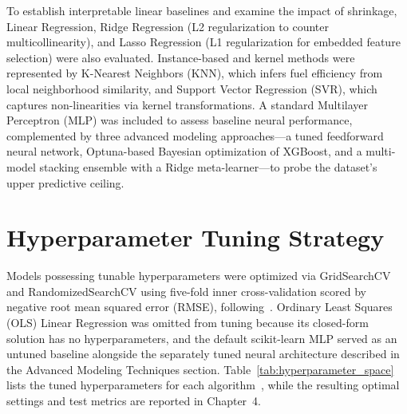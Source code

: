 To establish interpretable linear baselines and examine the impact of shrinkage, Linear Regression, Ridge Regression (L2 regularization to counter multicollinearity), and Lasso Regression (L1 regularization for embedded feature selection) were also evaluated. Instance-based and kernel methods were represented by K-Nearest Neighbors (KNN), which infers fuel efficiency from local neighborhood similarity, and Support Vector Regression (SVR), which captures non-linearities via kernel transformations. A standard Multilayer Perceptron (MLP) was included to assess baseline neural performance, complemented by three advanced modeling approaches---a tuned feedforward neural network, Optuna-based Bayesian optimization of XGBoost, and a multi-model stacking ensemble with a Ridge meta-learner---to probe the dataset's upper predictive ceiling.


\section{Hyperparameter Tuning Strategy}

Models possessing tunable hyperparameters were optimized via GridSearchCV and RandomizedSearchCV using five-fold inner cross-validation scored by negative root mean squared error (RMSE), following~\cite{atique2026explainable}. Ordinary Least Squares (OLS) Linear Regression was omitted from tuning because its closed-form solution has no hyperparameters, and the default scikit-learn MLP served as an untuned baseline alongside the separately tuned neural architecture described in the Advanced Modeling Techniques section. Table~\ref{tab:hyperparameter_space} lists the tuned hyperparameters for each algorithm~\cite{atique2026explainable}, while the resulting optimal settings and test metrics are reported in Chapter~4.

